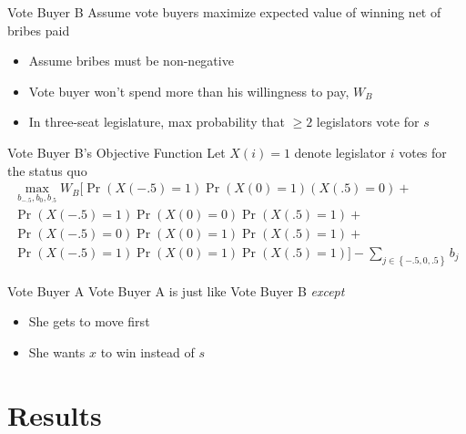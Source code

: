 \documentclass{beamer}
\begin{document}
\begin{frame}{Vote Buyer B}
\pause
Assume vote buyers maximize expected value of winning net of bribes paid  
\pause
\begin{itemize}[<+->]
	\item Assume bribes must be non-negative
	\item Vote buyer won't spend more than his willingness to pay, $W_B$
	\item In three-seat legislature, max probability that $\geq 2$ legislators vote for $s$
\end{itemize}
\end{frame}

\begin{frame}{Vote Buyer B's Objective Function}
\pause
Let $X(i) = 1$ denote legislator $i$ votes for the status quo
\pause
\begin{multline*}
			    \max_{b_{-.5}, b_0, b_{.5}} 
					W_B \biggl[ \Pr\left(X\left(-.5\right)=1\right)\Pr\left(X\left(0\right)=1\right)\left(X\left(.5\right)=0\right)  + \\
					\Pr\left(X\left(-.5\right)=1\right)\Pr\left(X\left(0\right)=0\right)\Pr\left(X\left(.5\right)=1\right) + \\
					\Pr\left(X\left(-.5\right)=0\right)\Pr\left(X\left(0\right)=1\right)\Pr\left(X\left(.5\right)=1\right) + \\
					\Pr\left(X\left(-.5\right)=1\right)\Pr\left(X\left(0\right)=1\right)\Pr\left(X\left(.5\right)=1\right) \biggr] - \sum_{j\in \left\{-.5, 0,.5\right\}} b_j
				\end{multline*}
\end{frame}


\begin{frame}{Vote Buyer A}
\pause
Vote Buyer A is just like Vote Buyer B \textit{except}
\pause
\begin{itemize}[<+->]
	\item She gets to move first
	\item She wants $x$ to win instead of $s$
\end{itemize}
\end{frame}





\section{Results}
\end{document}
